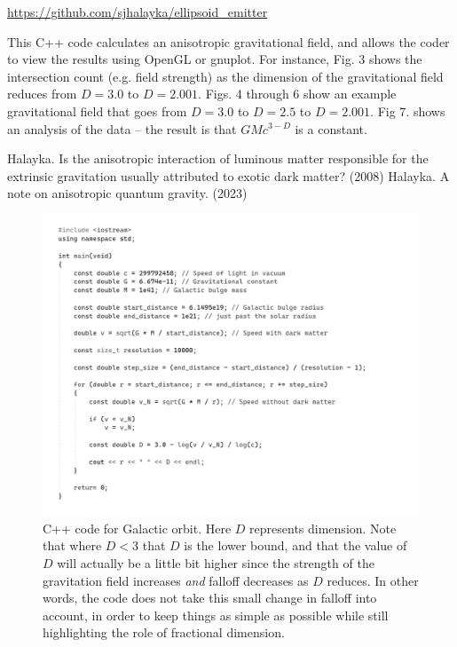 \documentclass[12pt]{article}
\begin{document}
\url{https://github.com/sjhalayka/ellipsoid_emitter}

This C++ code calculates an anisotropic gravitational field, and allows the coder to view the results using OpenGL or gnuplot.
For instance, Fig. 3 shows the intersection count (e.g. field strength) as the dimension of the gravitational field reduces from $D = 3.0$ to $D = 2.001$. 
Figs. 4 through 6 show an example gravitational field that goes from $D = 3.0$ to $D = 2.5$ to $D = 2.001$.
Fig 7. shows an analysis of the data -- the result is that $GM c^{3 - D}$ is a constant.





\begin{thebibliography}{9}

 Halayka. Is the anisotropic interaction of luminous matter responsible for the extrinsic gravitation usually attributed to exotic dark matter? (2008)
 Halayka. A note on anisotropic quantum gravity. (2023)
\end{thebibliography}





\pagebreak


\begin{figure} 
\centering
  \includegraphics[width = 5 in]{code.png}
  \caption{ C++ code for Galactic orbit. 
Here $D$ represents dimension.
Note that where $D < 3$ that $D$ is the lower bound, and that the value of $D$ will actually be a little bit higher since the strength of the gravitation field increases {\textit{and}} falloff decreases as $D$ reduces.
In other words, the code does not take this small change in falloff into account, in order to keep things as simple as possible while still highlighting the role of fractional dimension.
}
\end{figure}
\end{document}
